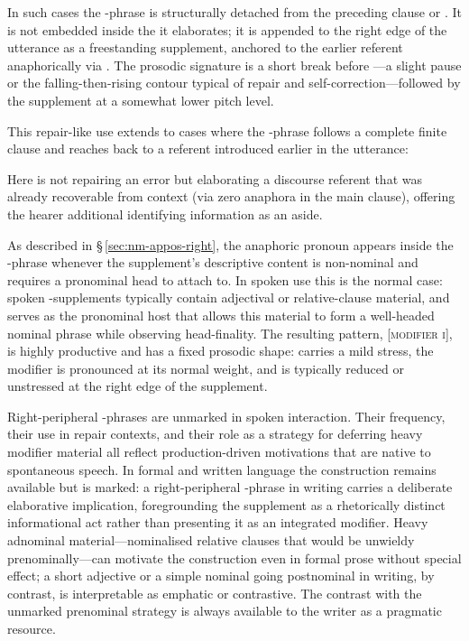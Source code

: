 In such cases the -phrase is structurally detached from the preceding
clause or . It is not embedded inside the  it
elaborates; it is appended to the right edge of the utterance as a freestanding
supplement, anchored to the earlier referent anaphorically via . The
prosodic signature is a short break before ---a slight pause or the
falling-then-rising contour typical of repair and self-correction---followed by
the supplement at a somewhat lower pitch level.

This repair-like use extends to cases where the -phrase follows a
complete finite clause and reaches back to a referent introduced earlier in the
utterance:

\pex
\a {}
\xe

Here  is not repairing an error but elaborating a
discourse referent that was already recoverable from context (via zero anaphora
in the main clause), offering the hearer additional identifying information as
an aside.

As described in \S\,\ref{sec:nm-appos-right}, the anaphoric pronoun 
appears inside the -phrase whenever the supplement's descriptive content
is non-nominal and requires a pronominal head to attach to. In spoken use this
is the normal case: spoken -supplements typically contain adjectival or
relative-clause material, and  serves as the pronominal host that allows
this material to form a well-headed nominal phrase while observing
head-finality. The resulting pattern,  \textsc{[modifier i]}, is highly
productive and has a fixed prosodic shape:  carries a mild stress, the
modifier is pronounced at its normal weight, and  is typically reduced or
unstressed at the right edge of the supplement.

Right-peripheral -phrases are unmarked in spoken interaction. Their
frequency, their use in repair contexts, and their role as a strategy for
deferring heavy modifier material all reflect production-driven motivations that
are native to spontaneous speech. In formal and written language the
construction remains available but is marked: a right-peripheral -phrase
in writing carries a deliberate elaborative implication, foregrounding the
supplement as a rhetorically distinct informational act rather than presenting
it as an integrated modifier. Heavy adnominal material---nominalised relative
clauses that would be unwieldy prenominally---can motivate the construction even
in formal prose without special effect; a short adjective or a simple nominal
going postnominal in writing, by contrast, is interpretable as emphatic or
contrastive. The contrast with the unmarked prenominal strategy is always
available to the writer as a pragmatic resource.
